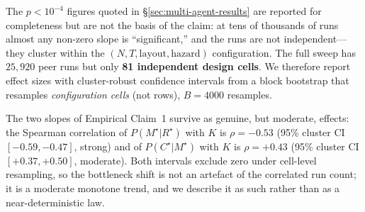 \documentclass{article}
\begin{document}
The $p<10^{-4}$ figures quoted in \S\ref{sec:multi-agent-results} are reported for completeness but are not the basis of the claim: at tens of thousands of runs almost any non-zero slope is ``significant,'' and the runs are not independent---they cluster within the $(N,T,\text{layout},\text{hazard})$ configuration. The full sweep has $25{,}920$ peer runs but only \textbf{81 independent design cells}. We therefore report effect sizes with cluster-robust confidence intervals from a block bootstrap that resamples \emph{configuration cells} (not rows), $B{=}4000$ resamples.

The two slopes of Empirical Claim~1 survive as genuine, but moderate, effects: the Spearman correlation of $P(M^\star|R^\star)$ with $K$ is $\rho=-0.53$ (95\% cluster CI $[-0.59,-0.47]$, strong) and of $P(C^\star|M^\star)$ with $K$ is $\rho=+0.43$ (95\% cluster CI $[+0.37,+0.50]$, moderate). Both intervals exclude zero under cell-level resampling, so the bottleneck shift is not an artefact of the correlated run count; it is a moderate monotone trend, and we describe it as such rather than as a near-deterministic law.
\end{document}
